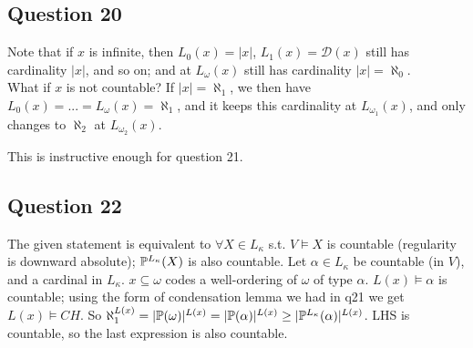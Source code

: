\documentclass[a4paper]{article}
\begin{document}
\subsection{Question 20}
Note that if $x$ is infinite, then $L_0(x) = |x|$, $L_1(x) = \mathcal{D}(x)$ still has cardinality $|x|$, and so on; and at $L_\omega(x)$ still has cardinality $|x| = \aleph_0$.\\
What if $x$ is not countable? If $|x| = \aleph_1$, we then have $L_0(x) = ... = L_\omega(x)=\aleph_1$, and it keeps this cardinality at $L_{\omega_1}(x)$, and only changes to $\aleph_2$ at $L_{\omega_2}(x)$.

This is instructive enough for question 21.

\subsection{Question 22}

The given statement is equivalent to $\forall X \in L_\kappa$ s.t. $V \vDash X$ is countable (regularity is downward absolute); $\P^{L_\kappa}(X)$ is also countable. Let $\alpha \in L_\kappa$ be countable (in $V$), and a  cardinal in $L_{\kappa}$. $x \subseteq \omega$ codes a well-ordering of $\omega$ of type $\alpha$. $L(x) \vDash \alpha$ is countable; using the form of condensation lemma we had in q21 we get $L(x) \vDash CH$. So $\aleph_1^{L(x)} = |\P(\omega)|^{L(x)} = |\P(\alpha)|^{L(x)} \geq 
|\P^{L_\kappa}(\alpha)|^{L(x)}$. LHS is countable, so the last expression is also countable.
\end{document}
